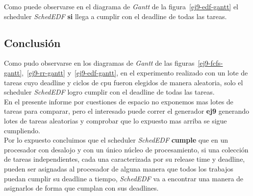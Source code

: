 Como puede observarse en el diagrama de \textit{Gantt} de la figura~\ref{ej9-edf-gantt} el scheduler \textit{SchedEDF} \textbf{si} llega a cumplir con el deadline de todas las tareas.\\

\subsection{Conclusión}
 
Como pudo observarse en los diagramas de \textit{Gantt} de las figuras~\ref{ej9-fcfs-gantt},~\ref{ej9-rr-gantt} y~\ref{ej9-edf-gantt}, en el experimento realizado con un lote de tareas cuyo deadline y ciclos de cpu fueron elegidos de manera aleatoria, solo el scheduler \textit{SchedEDF} logro cumplir con el deadline de todas las tareas.\\
En el presente informe por cuestiones de espacio no exponemos mas lotes de tareas para comparar, pero el interesado puede correr el generador \textbf{ej9} generando lotes de tareas aleatorias y comprobar que lo expuesto mas arriba se sigue cumpliendo.\\
Por lo expuesto concluimos que el scheduler \textit{SchedEDF} \textbf{cumple} que en un procesador con desalojo y con un único núcleo de procesamiento, si una colección de tareas independientes, cada una caracterizada por su release time y deadline, pueden ser asignadas al procesador de alguna manera que todos los trabajos puedan cumplir su deadline a tiempo, \textit{SchedEDF} va a encontrar una manera de asignarlos de forma que cumplan con sus deadlines.
